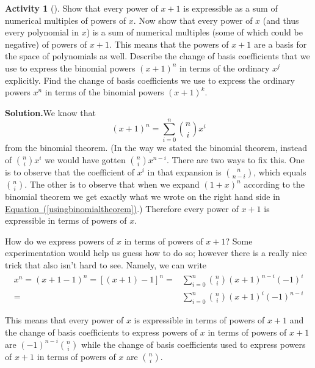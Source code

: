 \documentclass[10pt,]{book}
\theoremstyle{plain}
\theoremstyle{definition}
\newtheorem{activity}[project]{Activity}
\numberwithin{equation}{chapter}
\newcommand{\amp}{&}
\begin{document}
\begin{activity}[]\label{activity-132}
Show that every power of \(x+1\) is expressible as a sum of numerical multiples of powers of \(x\). Now show that every power of \(x\) (and thus every polynomial in \(x\)) is a sum of numerical multiples (some of which could be negative) of powers of \(x+1\). This means that the powers of \(x+1\) are a basis for the space of polynomials as well. Describe the change of basis coefficients that we use to express the binomial powers \((x+1)^n\) in terms of the ordinary \(x^j\) explicitly. Find the change of basis coefficients we use to express the ordinary powers \(x^n\) in terms of the binomial powers \((x+1)^k\).%
\par\medskip\noindent%
\textbf{Solution.}\quad We know that%
\begin{equation}
(x+1)^n=\sum_{i=0}^n \binom{n}{i}x^{i}\label{usingbinomialtheorem}
\end{equation}
from the binomial theorem. (In the way we stated the binomial theorem, instead of \(\binom{n}{i}x^i\) we would have gotten \(\binom{n}{i}x^{n-i}\). There are two ways to fix this. One is to observe that the coefficient of \(x^i\) in that expansion is \(\binom{n}{n-i}\), which equals \(\binom{n}{i}\). The other is to observe that when we expand \((1+x)^n\) according to the binomial theorem we get exactly what we wrote on the right hand side in \hyperref[usingbinomialtheorem]{Equation~(\ref{usingbinomialtheorem})}.) Therefore every power of \(x+1\) is expressible in terms of powers of \(x\).%
\par
How do we express powers of \(x\) in terms of powers of \(x+1\)? Some experimentation would help us guess how to do so; however there is a really nice trick that also isn't hard to see. Namely, we can write%
\begin{align*}
x^n =(x+1-1)^n= [(x+1) -1]^n =\amp  \sum_{i=0}^n \binom{n}{i}(x+1)^{n-i}(-1)^i\\
=\amp 
\sum_{i=0}^n \binom{n}{i}(x+1)^i(-1)^{n-i}
\end{align*}
%
\par
This means that every power of \(x\) is expressible in terms of powers of \(x+1\) and the change of basis coefficients to express powers of \(x\) in terms of powers of \(x+1\) are \((-1)^{n-i}\binom{n}{i}\) while the change of basis coefficients used to express powers of \(x+1\) in terms of powers of \(x\) are \(\binom{n}{i}\).%
\end{activity}
\end{document}
